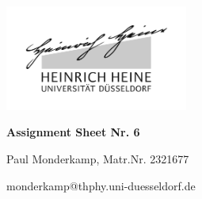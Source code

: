 \documentclass[12pt,a4paper]{article}	%
\begin{document}

\setlength{\parindent}{0pt}


\thispagestyle{empty}

\begin{titlepage}
	\centering
	\includegraphics[width=0.45\textwidth]{logo_sw.jpg}\par\vspace{1cm}
	\vspace{1cm}
	\vspace{1.5cm}
	{\LARGE\bfseries Assignment Sheet Nr. 6\\  \par}
	\vspace{1cm}
	
	{\large	Paul Monderkamp, Matr.Nr. 2321677\par}
	\vfill
	

	\vfill

	{\large  monderkamp@thphy.uni-duesseldorf.de \par}
	\vspace{2cm}
\end{titlepage}

\thispagestyle{empty} %
\newpage	%
\end{document}
